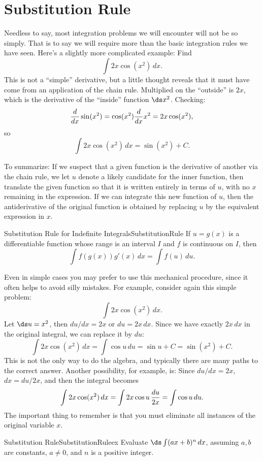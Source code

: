 \section{Substitution Rule}\label{sec:SubRule}
Needless to say, most integration problems we will encounter will
not be so simply. That is to say we will require more than the basic
integration rules we have seen. Here's a slightly more complicated example: Find
$$\int 2x\cos(x^2)\,dx.$$
This is not a ``simple'' derivative, but a little thought reveals that
it must have come from an application of the chain rule. Multiplied
on the ``outside'' is $2x$, which is the derivative of the ``inside''
function $\ds x^2$. Checking:
$${d\over dx}\sin(x^2)  = \cos(x^2){d\over dx}x^2 = 2x\cos(x^2),$$
so 
$$\int 2x\cos(x^2)\,dx=\sin(x^2)+C .$$

To summarize: If we suspect that a given function is the derivative of
another via the chain rule, we let $u$ denote a likely candidate for
the inner function, then translate the given function so that it is
written entirely in terms of $u$, with no $x$ remaining in the
expression. If we can integrate this new function of $u$, then the
antiderivative of the original function is obtained by replacing $u$
by the equivalent expression in $x$.

\begin{theorem}{Substitution Rule for Indefinite Integrals}{SubstitutionRule}
If $u=g(x)$ is a differentiable function whose range is an interval $I$ and $f$ is continuous on $I$, then
$$\int f(g(x))g'(x)\,dx=\int f(u)\,du.$$
\end{theorem}

Even in simple cases you may prefer to use this mechanical procedure,
since it often helps to avoid silly mistakes. For example, consider
again this simple problem:
$$\int 2x\cos(x^2)\,dx.$$
Let $\ds u=x^2$, then $du/dx = 2x$ or $du = 2x\,dx$. Since we have exactly 
$2x\,dx$ in the original integral, we can replace it by $du$:
$$\int 2x\cos(x^2)\,dx=\int \cos u\,du=\sin u +C = \sin(x^2)+C.$$
This is not the only way to do the algebra, and typically there are
many paths to the correct answer. Another possibility, for example,
is: Since $du/dx = 2x$, $dx=du/2x$, and then the integral becomes
$$\int 2x\cos(x^2)\,dx=\int 2x\cos u\,{du\over 2x}=\int \cos u\,du.$$
The important thing to remember is that you must eliminate all
instances of the original variable $x$.

\begin{example}{Substitution Rule}{SubstitutionRuleex}
Evaluate $\ds\int(ax+b)^n\,dx$, assuming $a,b$ are
constants, $a\not=0$, and $n$ is a positive integer.
\end{example}

